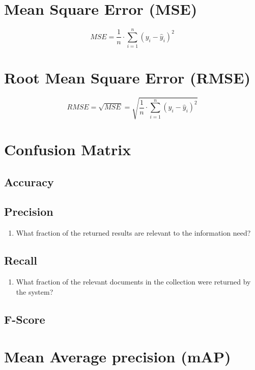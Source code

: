 \section{Mean Square Error (MSE)}\label{Mean Square Error (MSE)}
\[
    MSE = \displaystyle\dfrac{1}{n} \cdot \sum_{i=1}^{n} ( y_i - \hat{y}_i )^2
\]

\section{Root Mean Square Error (RMSE)}\label{Root Mean Square Error (RMSE)}
\[
    RMSE = \sqrt{MSE} = \displaystyle\sqrt{\dfrac{1}{n} \cdot \sum_{i=1}^{n} ( y_i - \hat{y}_i )^2}
\]


\section{Confusion Matrix}
\subsection{Accuracy}

\subsection{Precision}
\begin{enumerate}
    \item What fraction of the returned results are relevant to the information need? \cite{ir-1}
\end{enumerate}

\subsection{Recall}
\begin{enumerate}
    \item What fraction of the relevant documents in the collection were returned by the system? \cite{ir-1}
\end{enumerate}

\subsection{F-Score}


\section{Mean Average precision (mAP)}\label{Mean Average precision (mAP)}


















































